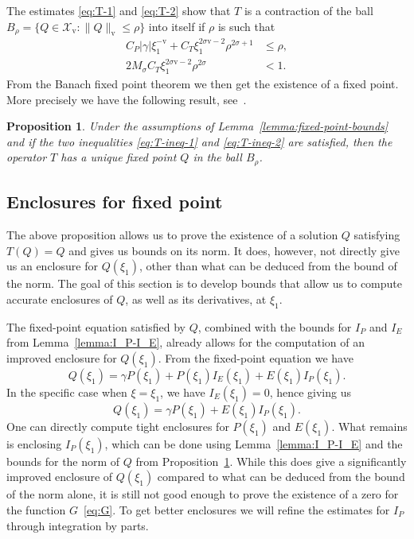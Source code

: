\documentclass[11pt]{article}
\newcommand{\normv}{\mathrm{v}}
\newcommand{\Space}{\mathcal{X}}
\newtheorem{proposition}[definition]{Proposition}
\begin{document}
The estimates \eqref{eq:T-1} and \eqref{eq:T-2} show that \(T\) is a
contraction of the ball
\(B_\rho = \{Q \in \Space_\normv : \|Q\|_\normv \leq \rho\}\) into
itself if \(\rho\) is such that
\begin{align}
  \label{eq:T-ineq-1}
  C_{P}|\gamma|\xi_{1}^{-\normv} + C_{T}\xi_{1}^{2\sigma \normv - 2}\rho^{2\sigma + 1} &\leq \rho,\\
  \label{eq:T-ineq-2}
  2M_{\sigma}C_{T}\xi_{1}^{2\sigma \normv - 2}\rho^{2\sigma} &< 1.
\end{align}
From the Banach fixed point theorem we then get the existence of a
fixed point. More precisely we have the following result,
see~\cite[Proposition A.3]{Plech2001}.

\begin{proposition}\label{prop:fixed-point}
  Under the assumptions of Lemma~\ref{lemma:fixed-point-bounds} and if
  the two inequalities \eqref{eq:T-ineq-1} and \eqref{eq:T-ineq-2} are
  satisfied, then the operator \(T\) has a unique fixed point \(Q\) in
  the ball \(B_{\rho}\).
\end{proposition}

\subsection{Enclosures for fixed point}
\label{sec:fixed-point-enclosures}
The above proposition allows us to prove the existence of a solution
\(Q\) satisfying \(T(Q) = Q\) and gives us bounds on its norm. It
does, however, not directly give us an enclosure for \(Q(\xi_{1})\),
other than what can be deduced from the bound of the norm. The goal of
this section is to develop bounds that allow us to compute accurate
enclosures of \(Q\), as well as its derivatives, at \(\xi_{1}\).

The fixed-point equation satisfied by \(Q\), combined with the bounds
for \(I_{P}\) and \(I_{E}\) from Lemma~\ref{lemma:I_P-I_E}, already
allows for the computation of an improved enclosure for \(Q(\xi_{1})\).
From the fixed-point equation we have
\begin{equation*}
  Q(\xi_{1}) = \gamma P(\xi_{1}) + P(\xi_{1})I_{E}(\xi_{1}) + E(\xi_{1})I_{P}(\xi_{1}).
\end{equation*}
In the specific case when \(\xi = \xi_{1}\), we have
\(I_{E}(\xi_{1}) = 0\), hence giving us
\begin{equation*}
  Q(\xi_{1}) = \gamma P(\xi_{1}) + E(\xi_{1})I_{P}(\xi_{1}).
\end{equation*}
One can directly compute tight enclosures for \(P(\xi_{1})\) and
\(E(\xi_{1})\). What remains is enclosing \(I_{P}(\xi_{1})\), which
can be done using Lemma~\ref{lemma:I_P-I_E} and the bounds for the
norm of \(Q\) from Proposition~\ref{prop:fixed-point}. While this does
give a significantly improved enclosure of \(Q(\xi_{1})\) compared to
what can be deduced from the bound of the norm alone, it is still not
good enough to prove the existence of a zero for the function
\(G\)~\eqref{eq:G}. To get better enclosures we will refine the
estimates for \(I_{P}\) through integration by parts.
\end{document}
